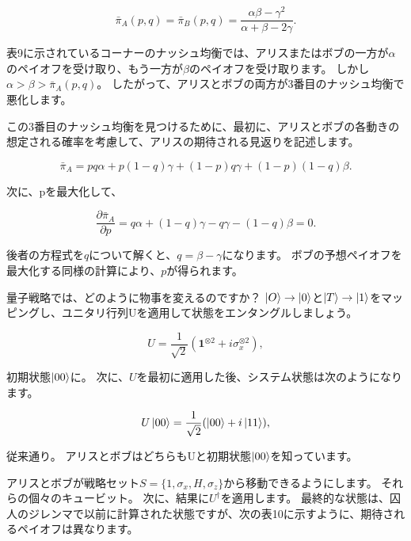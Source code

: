 \begin{equation}
\label{156}
\bar{\pi}_A (p, q ) 
=
\bar{\pi}_B (p, q)
=
\frac{\alpha \beta - \gamma^2}{\alpha + \beta - 2 \gamma}.
\end{equation}

表9に示されているコーナーのナッシュ均衡では、アリスまたはボブの一方が$\alpha$のペイオフを受け取り、もう一方が$\beta$のペイオフを受け取ります。 しかし$\alpha > \beta > \bar{\pi}_A(p,q)$。 したがって、アリスとボブの両方が3番目のナッシュ均衡で悪化します。

この3番目のナッシュ均衡を見つけるために、最初に、アリスとボブの各動きの想定される確率を考慮して、アリスの期待される見返りを記述します。

\begin{equation}
\label{157}
\bar{\pi}_A
= pq \alpha + p(1-q) \gamma + (1-p)q \gamma + (1-p)(1-q) \beta.
\end{equation}

次に、pを最大化して、

\begin{equation}
\label{158}
\frac{\partial \bar{\pi}_A}{\partial p}
= q \alpha + (1-q) \gamma -q \gamma - (1-q) \beta =0.
\end{equation}

後者の方程式を$q$について解くと、$q = \beta - \gamma$になります。 ボブの予想ペイオフを最大化する同様の計算により、$p$が得られます。

量子戦略では、どのように物事を変えるのですか？ $\ket{O} \to \ket{0} $と$ \ket{T} \to \ket{1}$をマッピングし、ユニタリ行列Uを適用して状態をエンタングルしましょう。

\begin{equation}
\label{159}
U=
\frac{1}{\sqrt{2}} (\mathbf{1}^{\otimes 2} + i \sigma_x^{\otimes 2}),
\end{equation}

初期状態$\ket{00}$に。 次に、$U$を最初に適用した後、システム状態は次のようになります。

\begin{equation}
\label{160}
U \ket{00} =
\frac{1}{\sqrt{2}} ( \ket{00} + i \ket{11}),
\end{equation}

従来通り。 アリスとボブはどちらもUと初期状態$\ket{00}$を知っています。

アリスとボブが戦略セット$S = \{1, \sigma_x, H, \sigma_z \}$から移動できるようにします。
それらの個々のキュービット。 次に、結果に$U^\dagger$を適用します。 最終的な状態は、囚人のジレンマで以前に計算された状態ですが、次の表10に示すように、期待されるペイオフは異なります。

